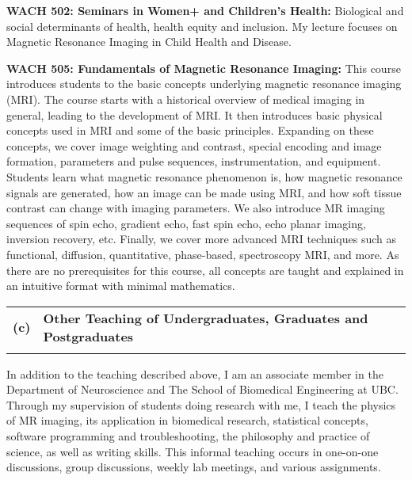 \documentclass[11pt,notitlepage,english]{report}
\begin{document}
\vspace{5pt}

\textbf{WACH 502: Seminars in Women+ and Children's Health:} Biological and social determinants of health, health equity and inclusion. My lecture focuses on Magnetic Resonance Imaging in Child Health and Disease.

\vspace{5pt}

\textbf{WACH 505: Fundamentals of Magnetic Resonance Imaging:} This course introduces students to the basic concepts underlying magnetic resonance imaging (MRI). The course starts with a historical overview of medical imaging in general, leading to the development of MRI. It then introduces basic physical concepts used in MRI and some of the basic principles. Expanding on these concepts, we cover image weighting and contrast, special encoding and image formation, parameters and pulse sequences, instrumentation, and equipment. Students learn what magnetic resonance phenomenon is, how magnetic resonance signals are generated, how an image can be made using MRI, and how soft tissue contrast can change with imaging parameters. We also introduce MR imaging sequences of spin echo, gradient echo, fast spin echo, echo planar imaging, inversion recovery, etc. Finally, we cover more advanced MRI techniques such as functional, diffusion, quantitative, phase-based, spectroscopy MRI, and more. As there are no prerequisites for this course, all concepts are taught and explained in an intuitive format with minimal mathematics.


\begin{tabular}{L{.5cm} L{8cm} L{6.9cm}}
  \\
  \textbf{(c)} & \textbf{Other Teaching of Undergraduates, Graduates and Postgraduates} \\
  \\
\end{tabular}

In addition to the teaching described above, I am an associate member in the Department of Neuroscience and The School of Biomedical Engineering at UBC. Through my supervision of students doing research with me, I teach the physics of MR imaging, its application in biomedical research, statistical concepts, software programming and troubleshooting, the philosophy and practice of science, as well as writing skills. This informal teaching occurs in one-on-one discussions, group discussions, weekly lab meetings, and various assignments.
\end{document}
